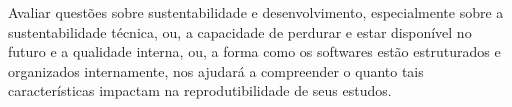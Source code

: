 %
%
%
%
%
%
%
%
%
%
%
%
%
%
%
%

Avaliar questões sobre sustentabilidade e desenvolvimento, especialmente sobre
a sustentabilidade técnica, ou, a capacidade de perdurar e estar disponível no
futuro e a qualidade interna, ou, a forma como os softwares estão estruturados
e organizados internamente, nos ajudará a compreender o quanto tais
características impactam na reprodutibilidade de seus estudos.


